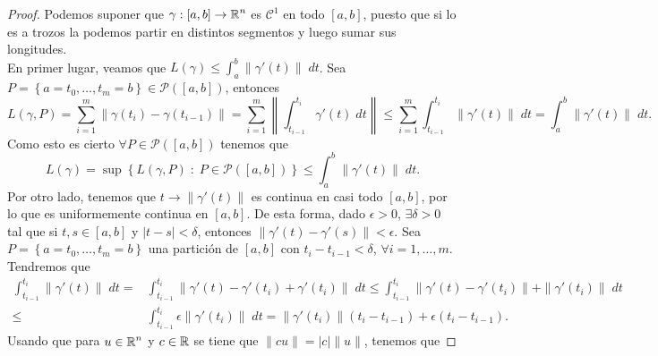\begin{proof}
	Podemos suponer que $\displaystyle \gamma : \left[a,b\right] \to \mathbb{R}^{n} $ es $\displaystyle \mathcal{C}^{1} $ en todo $\displaystyle \left[a,b\right]  $, puesto que si lo es a trozos la podemos partir en distintos segmentos y luego sumar sus longitudes. \\
	En primer lugar, veamos que $\displaystyle L\left(\gamma \right)\leq \int^{b}_{a} \|\gamma'\left(t\right)\| \; dt $. Sea $\displaystyle P = \left\{ a = t_{0}, \ldots, t_{m} = b\right\} \in \mathcal{P}\left(\left[a,b\right] \right) $, entonces
\[
	L\left(\gamma, P\right)=  \sum^{m}_{i = 1}\|\gamma\left(t_{i}\right)-\gamma\left(t_{i-1}\right)\| = \sum^{m}_{i = 1}\left\|\int^{t_{i}}_{t_{i-1}} \gamma'\left(t\right) \; dt\right\| \leq \sum^{m}_{i = 1}\int^{t_{i}}_{t_{i-1}} \|\gamma'\left(t\right)\| \; dt = \int^{b}_{a} \|\gamma'\left(t\right)\| \; dt.
\]
Como esto es cierto $\displaystyle \forall P \in \mathcal{P}\left(\left[a,b\right] \right) $ tenemos que 
\[L\left(\gamma \right)=\sup \left\{ L\left(\gamma, P\right) \; : \; P \in \mathcal{P}\left(\left[a,b\right] \right)\right\} \leq \int^{b}_{a} \|\gamma'\left(t\right)\| \; dt .\]
Por otro lado, tenemos que $\displaystyle t \to \|\gamma'\left(t\right)\| $ es continua en casi todo $\displaystyle \left[a,b\right]  $, por lo que es uniformemente continua en $\displaystyle \left[a,b\right]  $. 
De esta forma, dado $\displaystyle \epsilon > 0 $, $\displaystyle \exists \delta > 0 $ tal que si $\displaystyle t,s \in \left[a,b\right]  $ y $\displaystyle \left|t-s\right|<\delta  $, entonces $\displaystyle \|\gamma'\left(t\right)-\gamma'\left(s\right)\| < \epsilon  $. Sea $\displaystyle P = \left\{ a = t_{0}, \ldots, t_{m}= b\right\}  $ una partición de $\displaystyle \left[a,b\right]  $ con $\displaystyle t_{i}-t_{i-1} < \delta  $, $\displaystyle \forall i = 1, \ldots, m $. Tendremos que
\[
\begin{split}
	\int^{t_{i}}_{t_{i-1}} \|\gamma'\left(t\right)\| \; dt = & \int^{t_{i}}_{t_{i-1}} \|\gamma'\left(t\right)-\gamma'\left(t_{i}\right)+\gamma'\left(t_{i}\right)\| \; dt \leq \int^{t_{i}}_{t_{i-1}} \|\gamma'\left(t\right)-\gamma'\left(t_{i}\right)\| +\|\gamma'\left(t_{i}\right)\|\; dt \\
	\leq & \int^{t_{i}}_{t_{i-1}} \epsilon \|\gamma'\left(t_{i}\right)\| \; dt = \|\gamma'\left(t_{i}\right)\|\left(t_{i}-t_{i-1}\right) + \epsilon \left(t_{i}-t_{i-1}\right).
\end{split}
\]
Usando que para $\displaystyle u \in \mathbb{R}^{n} $ y $\displaystyle c \in \mathbb{R} $ se tiene que $\displaystyle \|cu\| = \left|c\right|\|u\| $, tenemos que

\end{proof}
